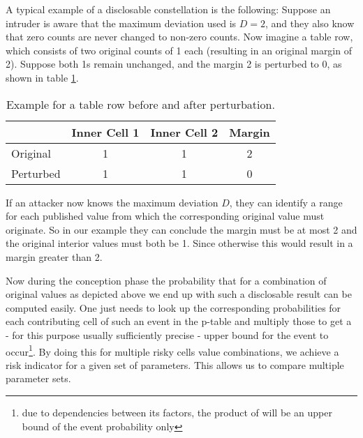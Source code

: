 A typical example of a disclosable constellation is the following: 
Suppose an intruder is aware that the maximum deviation used is $D=2$, and they also know that zero counts are never changed to non-zero counts. Now imagine a table row, which consists of two original counts of 1 each (resulting in an original margin of 2). Suppose both 1s remain unchanged, and the margin 2 is perturbed to 0, as shown in table \ref{ckm_ex_tab}.

\begin{table}[!th]
\centering
\begin{adjustbox}{max height=8cm,max width=\linewidth,keepaspectratio}
\begin{tabular}{|l|c|c|c|}

\hline
  & Inner Cell 1 & Inner Cell 2 & Margin \\
\hline
Original & 1 & 1 & 2 \\
\hline
Perturbed & 1 & 1 & 0 \\
\hline
\end{tabular}
\end{adjustbox}
\caption{Example for a table row before and after perturbation.}
\label{ckm_ex_tab}
\end{table}

If an attacker now knows the maximum deviation $D$, they can identify a range for each published value from which the corresponding original value must originate. So in our example they can conclude the margin must be at most 2 and the original interior values must both be 1. Since otherwise this would result in a margin greater than 2.

Now during the conception phase the probability that for a combination of original values as depicted above we end up with such a disclosable result can be computed easily. One just needs to look up the corresponding probabilities for each contributing cell of such an event in the p-table and multiply those to get a - for this purpose usually sufficiently precise - upper bound for the event to occur\footnote{due to dependencies between its factors, the product of will be an upper bound of the event probability only}.
By doing this for multiple risky cells value combinations, we achieve a risk indicator for a given set of parameters. This allows us to compare multiple parameter sets.

